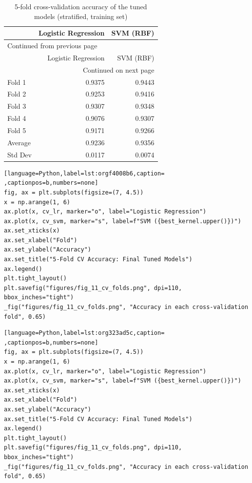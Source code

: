 \documentclass[11pt]{article}
\begin{document}
\begin{longtable}{|l|r|r|}
\caption{5-fold cross-validation accuracy of the tuned models (stratified, training set)}
\\[0pt]
\hline
 & Logistic Regression & SVM (RBF)\\[0pt]
\hline
\endfirsthead
\multicolumn{3}{l}{Continued from previous page} \\[0pt]
\hline

 & Logistic Regression & SVM (RBF) \\[0pt]

\hline
\endhead
\hline\multicolumn{3}{r}{Continued on next page} \\
\endfoot
\endlastfoot
\hline
Fold 1 & 0.9375 & 0.9443\\[0pt]
\hline
Fold 2 & 0.9253 & 0.9416\\[0pt]
\hline
Fold 3 & 0.9307 & 0.9348\\[0pt]
\hline
Fold 4 & 0.9076 & 0.9307\\[0pt]
\hline
Fold 5 & 0.9171 & 0.9266\\[0pt]
\hline
Average & 0.9236 & 0.9356\\[0pt]
\hline
Std Dev & 0.0117 & 0.0074\\[0pt]
\hline
\end{longtable}
\begin{lstlisting}[language=Python,label=lst:orgf4008b6,caption= ,captionpos=b,numbers=none]
fig, ax = plt.subplots(figsize=(7, 4.5))
x = np.arange(1, 6)
ax.plot(x, cv_lr, marker="o", label="Logistic Regression")
ax.plot(x, cv_svm, marker="s", label=f"SVM ({best_kernel.upper()})")
ax.set_xticks(x)
ax.set_xlabel("Fold")
ax.set_ylabel("Accuracy")
ax.set_title("5-Fold CV Accuracy: Final Tuned Models")
ax.legend()
plt.tight_layout()
plt.savefig("figures/fig_11_cv_folds.png", dpi=110, bbox_inches="tight")
_fig("figures/fig_11_cv_folds.png", "Accuracy in each cross-validation fold", 0.65)
\end{lstlisting}
\begin{lstlisting}[language=Python,label=lst:org323ad5c,caption= ,captionpos=b,numbers=none]
fig, ax = plt.subplots(figsize=(7, 4.5))
x = np.arange(1, 6)
ax.plot(x, cv_lr, marker="o", label="Logistic Regression")
ax.plot(x, cv_svm, marker="s", label=f"SVM ({best_kernel.upper()})")
ax.set_xticks(x)
ax.set_xlabel("Fold")
ax.set_ylabel("Accuracy")
ax.set_title("5-Fold CV Accuracy: Final Tuned Models")
ax.legend()
plt.tight_layout()
plt.savefig("figures/fig_11_cv_folds.png", dpi=110, bbox_inches="tight")
_fig("figures/fig_11_cv_folds.png", "Accuracy in each cross-validation fold", 0.65)
\end{lstlisting}
\end{document}
